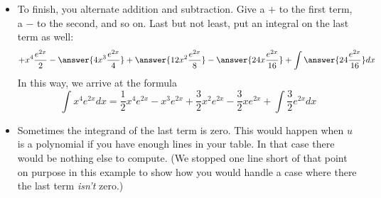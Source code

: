 \documentclass{ximera}
\begin{document}
\begin{example}
\begin{itemize}
\begin{center}
\end{center}
\item To finish, you alternate addition and subtraction. Give a $+$ to the first term, a $-$ to the second, and so on. Last but not least, put an integral on the last term as well:
\[ + x^4 \frac{e^{2x}}{2} - \answer{4 x^3 \frac{e^{2x}}{4}} + \answer{12 x^2 \frac{e^{2x}}{8}} - \answer{24 x\frac{e^{2x}}{16} }+ \int \answer{24 \frac{e^{2x}}{16}} dx \]
In this way, we arrive at the formula
\[ \int x^4 e^{2x} dx = \frac{1}{2} x^4 e^{2x} - x^3 e^{2x} + \frac{3}{2} x^2 e^{2x} - \frac{3}{2} x e^{2x} + \int \frac{3}{2} e^{2x} dx \]
\item Sometimes the integrand of the last term is zero. This would happen when $u$ is a polynomial if you have enough lines in your table. In that case there would be nothing else to compute.  (We stopped one line short of that point on purpose in this example to show how you would handle a case where there the last term \textit{isn't} zero.)
\end{itemize}
\end{example}
\begin{example}

\end{example}
\end{document}
